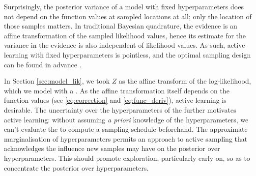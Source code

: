 \documentclass{article}
\begin{document}
Surprisingly, the posterior variance of a \gpb model with fixed hyperparameters does not depend on the function values at sampled locations at all; only the location of those samples matters. In traditional Bayesian quadrature, the evidence is an affine transformation of the sampled likelihood values, hence its estimate for the variance in the evidence is also independent of likelihood values. As such, active learning with fixed hyperparameters is pointless, and the optimal sampling design can be found in advance \cite{minka2000dqr}.

In Section \ref{sec:model_lik}, we took $Z$ as the affine transform of the log-likelihood, which we model with a \gp. As the affine transformation itself depends on the function values (see \eqref{eq:correction} and \eqref{eq:func_deriv}), active learning is  desirable. The uncertainty over the hyperparameters of the \gpb further motivates active learning: without assuming \textit{a priori} knowledge of the hyperparameters, we can't evaluate the \gpb to compute a sampling schedule beforehand. The approximate marginalisation of hyperparameters permits an approach to active sampling that acknowledges the influence new samples may have on the posterior over hyperparameters. This should promote exploration, particularly early on, so as to concentrate the posterior over hyperparameters. 
 
% 
\end{document}
